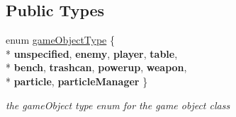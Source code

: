 \subsection*{Public Types}
\begin{DoxyCompactItemize}
\item 
enum \hyperlink{class_game_object_ad5092169e581fb0772e01026882ea0c8}{game\+Object\+Type} \{ \\*
{\bfseries unspecified}, 
{\bfseries enemy}, 
{\bfseries player}, 
{\bfseries table}, 
\\*
{\bfseries bench}, 
{\bfseries trashcan}, 
{\bfseries powerup}, 
{\bfseries weapon}, 
\\*
{\bfseries particle}, 
{\bfseries particle\+Manager}
 \}
\begin{DoxyCompactList}\small\item\em the game\+Object type enum for the game object class \end{DoxyCompactList}\end{DoxyCompactItemize}
